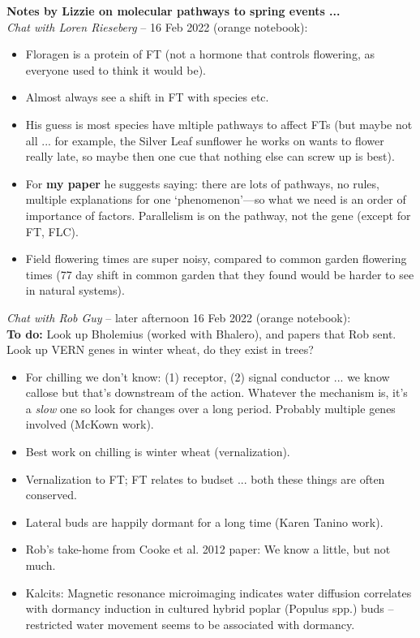 \documentclass[11pt,letter]{article}
\begin{document}
 

{\bf Notes by Lizzie on molecular pathways to spring events ...} \\

\emph{Chat with Loren Rieseberg} -- 16 Feb 2022 (orange notebook):
\begin{itemize}
\item  Floragen is a protein of FT (not a hormone that controls flowering, as everyone used to think it would be).
\item  Almost always see a shift in FT with species etc.
\item  His guess is most species have mltiple pathways to affect FTs (but maybe not all ... for example, the Silver Leaf sunflower he works on wants to flower really late, so maybe then one cue that nothing else can screw up is best). 
\item  For {\bf my paper} he suggests saying: there are lots of pathways, no rules, multiple explanations for one `phenomenon'---so what we need is an order of importance of factors. Parallelism is on the pathway, not the gene (except for FT, FLC). 
\item  Field flowering times are super noisy, compared to common garden flowering times (77 day shift in common garden that they found would be harder to see in natural systems).
\end{itemize}

\emph{Chat with Rob Guy} -- later afternoon 16 Feb 2022 (orange notebook):\\

{\bf To  do:} Look up Bholemius (worked with Bhalero), and papers that Rob sent. Look up VERN genes in winter wheat, do they exist in trees?\\
\begin{itemize}
\item  For chilling we don't know: (1) receptor, (2) signal conductor ... we know callose but that's downstream of the action. Whatever the mechanism is, it's a \emph{slow} one so look for changes over a long period. Probably multiple genes involved (McKown work).
\item  Best work on chilling is winter wheat (vernalization). 
\item  Vernalization to FT; FT relates to budset ... both these things are often conserved.
\item  Lateral buds are happily dormant for a long time (Karen Tanino work). 
\item  Rob's take-home from Cooke et al. 2012 paper: We know a little, but not much.
\item  Kalcits: Magnetic resonance microimaging indicates water diffusion correlates with dormancy induction in cultured hybrid poplar
(Populus spp.) buds -- restricted water movement seems to be associated with dormancy.
\end{itemize}
\end{document}
